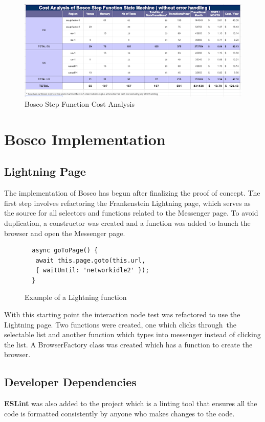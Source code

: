 \documentclass[12pt,a4paper,titlepage]{report}
\begin{document}
\begin{figure}[h]
  \centering
  \includegraphics[width=15cm]{./diagrams/sf_cost_analysis}
  \caption{Bosco Step Function Cost Analysis}
\end{figure}

\chapter{Bosco Implementation}

\section{Lightning Page}
The implementation of Bosco has begun after finalizing the proof of concept. The first step involves refactoring the Frankenstein Lightning page, which serves as the source for all selectors and functions related to the Messenger page. To avoid duplication, a constructor was created and a function was added to launch the browser and open the Messenger page.

\begin{figure}[H]
  \begin{tcolorbox}
    \begin{verbatim}
  async goToPage() {
   await this.page.goto(this.url, 
   { waitUntil: 'networkidle2' });
  }
\end{verbatim}
  \end{tcolorbox}
  \caption{Example of a Lightning function}
\end{figure}

With this starting point the interaction node test was refactored to use the Lightning page. Two functions were
created, one which clicks through the selectable list and another function which types into messenger instead of
clicking the list. A BrowserFactory class was created which has a function to create the browser.

\section{Developer Dependencies}
\textbf{ESLint} was also added to the project which is a linting tool that ensures all the code is formatted consistently
by anyone who makes changes to the code.  
\end{document}
